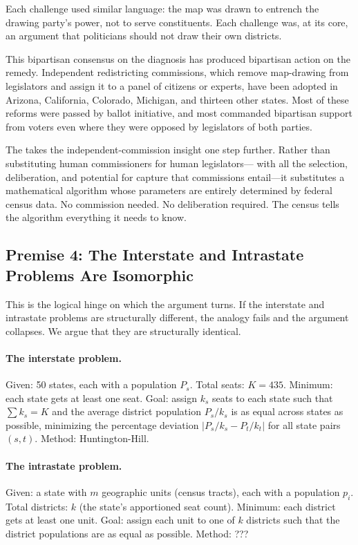 Each challenge used similar language: the map was drawn to entrench the
drawing party's power, not to serve constituents.
Each challenge was, at its core, an argument that politicians should not
draw their own districts.

This bipartisan consensus on the diagnosis has produced bipartisan action
on the remedy.
Independent redistricting commissions, which remove map-drawing from
legislators and assign it to a panel of citizens or experts, have been
adopted in Arizona, California, Colorado, Michigan, and thirteen other states.
Most of these reforms were passed by ballot initiative, and most commanded
bipartisan support from voters even where they were opposed by legislators
of both parties.

The \dia{} takes the independent-commission insight one step further.
Rather than substituting human commissioners for human legislators---
with all the selection, deliberation, and potential for capture that
commissions entail---it substitutes a mathematical algorithm whose
parameters are entirely determined by federal census data.
No commission needed.
No deliberation required.
The census tells the algorithm everything it needs to know.

\subsection{Premise 4: The Interstate and Intrastate Problems Are Isomorphic}

This is the logical hinge on which the argument turns.
If the interstate and intrastate problems are structurally different, the
analogy fails and the argument collapses.
We argue that they are structurally identical.

\paragraph{The interstate problem.}
Given: 50 states, each with a population $P_s$.
Total seats: $K = 435$.
Minimum: each state gets at least one seat.
Goal: assign $k_s$ seats to each state such that $\sum k_s = K$ and
the average district population $P_s / k_s$ is as equal across states
as possible, minimizing the percentage deviation $|P_s/k_s - P_t/k_t|$
for all state pairs $(s, t)$.
Method: Huntington-Hill.

\paragraph{The intrastate problem.}
Given: a state with $m$ geographic units (census tracts), each with a
population $p_i$.
Total districts: $k$ (the state's apportioned seat count).
Minimum: each district gets at least one unit.
Goal: assign each unit to one of $k$ districts such that the district
populations are as equal as possible.
Method: ???

